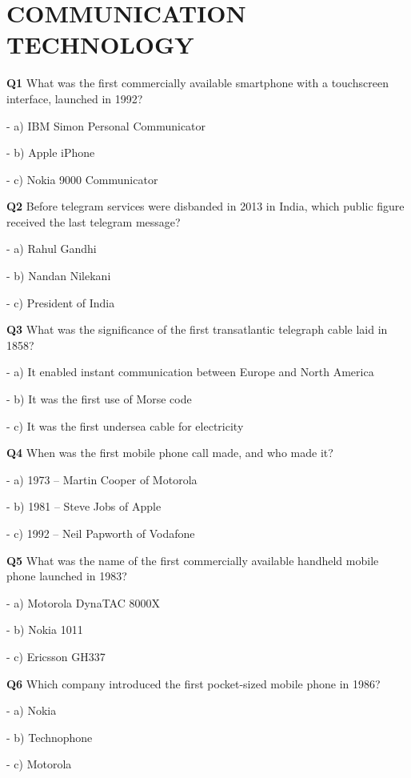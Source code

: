 \section{COMMUNICATION TECHNOLOGY}

\textbf{Q1} What was the first commercially available smartphone with a touchscreen interface, launched in 1992?\par
\quad - a) IBM Simon Personal Communicator\par
\quad - b) Apple iPhone\par
\quad - c) Nokia 9000 Communicator\par

\textbf{Q2} Before telegram services were disbanded in 2013 in India, which public figure received the last telegram message?\par
\quad - a) Rahul Gandhi\par
\quad - b) Nandan Nilekani\par
\quad - c) President of India\par

\textbf{Q3} What was the significance of the first transatlantic telegraph cable laid in 1858?\par
\quad - a) It enabled instant communication between Europe and North America\par
\quad - b) It was the first use of Morse code\par
\quad - c) It was the first undersea cable for electricity\par

\textbf{Q4} When was the first mobile phone call made, and who made it?\par
\quad - a) 1973 – Martin Cooper of Motorola\par
\quad - b) 1981 – Steve Jobs of Apple\par
\quad - c) 1992 – Neil Papworth of Vodafone\par

\textbf{Q5} What was the name of the first commercially available handheld mobile phone launched in 1983?\par
\quad - a) Motorola DynaTAC 8000X\par
\quad - b) Nokia 1011\par
\quad - c) Ericsson GH337\par

\textbf{Q6} Which company introduced the first pocket-sized mobile phone in 1986?\par
\quad - a) Nokia\par
\quad - b) Technophone\par
\quad - c) Motorola\par

